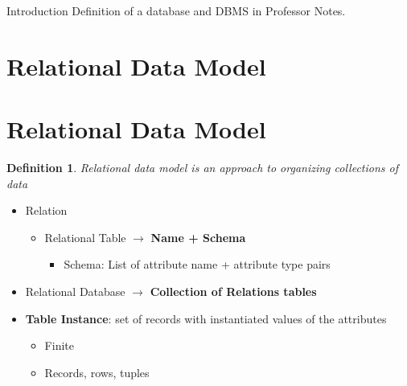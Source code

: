 \documentclass[twoside]{article}
\newcommand{\notes}[4]{
   \pagestyle{myheadings}
   \thispagestyle{plain}
   \newpage
   \setcounter{page}{1}
   \noindent
}
\newtheorem{definition}[theorem]{Definition}
\begin{document}
\tableofcontents
\notes





\section{Database and DBMS}

\section*{Introduction}
Definition of a database and DBMS in Professor Notes.

\newpage
\section{Relational Data Model}

\section*{Relational Data Model}
\begin{definition}
    Relational data model is an approach to organizing collections of data
\end{definition}

\begin{itemize}
    \item Relation
    \begin{itemize}
        \item Relational Table $\longrightarrow$ \textbf{Name + Schema}
        \begin{itemize}
            \item Schema: List of attribute name + attribute type pairs
        \end{itemize}
    \end{itemize}
    \item Relational Database $\longrightarrow$ \textbf{Collection of Relations 
    tables}
    \item \textbf{Table Instance}: set of records with instantiated values of 
    the attributes
    \begin{itemize}
        \item Finite
        \item Records, rows, tuples
    \end{itemize}
\end{itemize}
\end{document}
